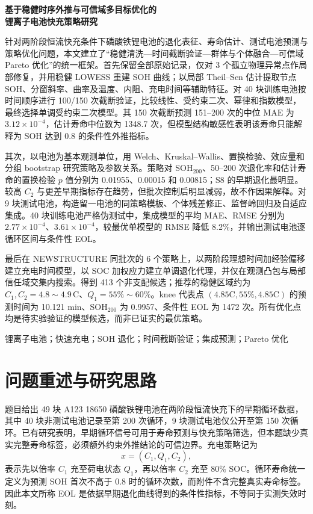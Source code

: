 \documentclass[UTF8,a4paper,zihao=-4]{ctexart}
\begin{document}
\begin{center}
  {\bfseries{} 基于稳健时序外推与可信域多目标优化的\\[0.35em]锂离子电池快充策略研究}
\end{center}

\vspace{0.8em}
针对两阶段恒流快充条件下磷酸铁锂电池的退化表征、寿命估计、测试电池预测与策略优化问题，本文建立了“稳健清洗—时间截断验证—群体与个体融合—可信域 Pareto 优化”的统一框架。首先保留全部原始记录，仅对 3 个孤立物理异常点作局部修复，并用稳健 LOWESS 重建 SOH 曲线；以局部 Theil--Sen 估计提取节点 SOH、分窗斜率、曲率及温度、内阻、充电时间等辅助特征。对 40 块训练电池按时间顺序进行 100/150 次截断验证，比较线性、受约束二次、幂律和指数模型，最终选择单调受约束二次模型。其 150 次截断预测 151--200 次的中位 MAE 为 $3.12\times10^{-4}$，估计寿命中位数为 1348.7 次，但模型结构敏感性表明该寿命只能解释为 SOH 达到 0.8 的条件性外推指标。

其次，以电池为基本观测单位，用 Welch、Kruskal--Wallis、置换检验、效应量和分组 bootstrap 研究策略及参数关系。策略对 SOH$_{200}$、50--200 次退化率和估计寿命的置换检验 $p$ 值分别为 0.01955、0.00015 和 0.00815；S8 的早期退化最明显。较高 $C_2$ 与更差早期指标存在趋势，但批次控制后明显减弱，故不作因果解释。对 9 块测试电池，构造留一电池的同策略模板、个体残差修正、监督岭回归及自适应集成。40 块训练电池严格伪测试中，集成模型的平均 MAE、RMSE 分别为 $2.77\times10^{-4}$、$3.61\times10^{-4}$，较最优单模型的 RMSE 降低 8.2\%，并输出测试电池逐循环区间与条件性 EOL。

最后在 NEWSTRUCTURE 同批次的 6 个策略上，以两阶段理想时间加经验偏移建立充电时间模型，以 SOC 加权应力建立单调退化代理，并仅在观测凸包与局部信任域交集内搜索。得到 413 个非支配候选；推荐的稳健区域约为 $C_1,C_2=4.8\sim4.9\,\mathrm C$、$Q_1=55\%\sim60\%$。knee 代表点 $(4.85\mathrm C,55\%,4.85\mathrm C)$ 的预测时间为 10.121 min、SOH$_{200}$ 为 0.9957、条件性 EOL 为 1472 次。所有优化点均是待实验验证的模型候选，而非已证实的最优策略。

\vspace{0.6em}
锂离子电池；快速充电；SOH 退化；时间截断验证；集成预测；Pareto 优化

\newpage

\section{问题重述与研究思路}\label{sec:intro}

题目给出 49 块 A123 18650 磷酸铁锂电池在两阶段恒流快充下的早期循环数据，其中 40 块非测试电池记录至第 200 次循环，9 块测试电池仅公开至第 150 次循环。已有研究表明，早期循环信号可用于寿命预测与快充策略筛选\cite{severson2019,attia2020}，但本题缺少真实完整寿命标签，必须额外约束外推结论的可信边界。充电策略记为
\[
  x=(C_1,Q_1,C_2),
\]
表示先以倍率 $C_1$ 充至荷电状态 $Q_1$，再以倍率 $C_2$ 充至 80\% SOC。循环寿命统一定义为预测 SOH 首次不高于 0.8 时的循环次数，而附件不含完整真实寿命标签。因此本文所称 EOL 是依据早期退化曲线得到的条件性指标，不等同于实测失效时刻。
\end{document}
